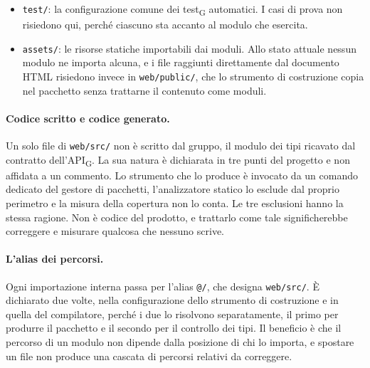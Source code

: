 \documentclass[a4paper, 10pt]{article}
\begin{document}
\begin{itemize}
    \item \texttt{test/}: la configurazione comune dei test\textsubscript{G} automatici. I casi di prova non risiedono qui, perché ciascuno sta accanto al modulo che esercita.

    \item \texttt{assets/}: le risorse statiche importabili dai moduli. Allo stato attuale nessun modulo ne importa alcuna, e i file raggiunti direttamente dal documento HTML risiedono invece in \texttt{web/public/}, che lo strumento di costruzione copia nel pacchetto senza trattarne il contenuto come moduli.
\end{itemize}

\paragraph{Codice scritto e codice generato.}
Un solo file di \texttt{web/src/} non è scritto dal gruppo, il modulo dei tipi ricavato dal contratto dell'API\textsubscript{G}. La sua natura è dichiarata in tre punti del progetto e non affidata a un commento. Lo strumento che lo produce è invocato da un comando dedicato del gestore di pacchetti, l'analizzatore statico lo esclude dal proprio perimetro e la misura della copertura non lo conta. Le tre esclusioni hanno la stessa ragione. Non è codice del prodotto, e trattarlo come tale significherebbe correggere e misurare qualcosa che nessuno scrive.

\paragraph{L'alias dei percorsi.}
Ogni importazione interna passa per l'alias \texttt{@/}, che designa \texttt{web/src/}. È dichiarato due volte, nella configurazione dello strumento di costruzione e in quella del compilatore, perché i due lo risolvono separatamente, il primo per produrre il pacchetto e il secondo per il controllo dei tipi. Il beneficio è che il percorso di un modulo non dipende dalla posizione di chi lo importa, e spostare un file non produce una cascata di percorsi relativi da correggere.
\end{document}
